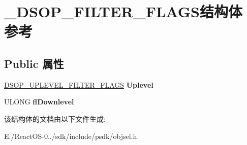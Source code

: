 \hypertarget{struct___d_s_o_p___f_i_l_t_e_r___f_l_a_g_s}{}\section{\+\_\+\+D\+S\+O\+P\+\_\+\+F\+I\+L\+T\+E\+R\+\_\+\+F\+L\+A\+G\+S结构体 参考}
\label{struct___d_s_o_p___f_i_l_t_e_r___f_l_a_g_s}
\subsection*{Public 属性}
\begin{DoxyCompactItemize}
\item 
\mbox{\label{struct___d_s_o_p___f_i_l_t_e_r___f_l_a_g_s_a6b1b0d65e434c73efa18ab8bf1bcc071}} 
\hyperlink{struct___d_s_o_p___u_p_l_e_v_e_l___f_i_l_t_e_r___f_l_a_g_s}{D\+S\+O\+P\+\_\+\+U\+P\+L\+E\+V\+E\+L\+\_\+\+F\+I\+L\+T\+E\+R\+\_\+\+F\+L\+A\+GS} {\bfseries Uplevel}
\item 
\mbox{\label{struct___d_s_o_p___f_i_l_t_e_r___f_l_a_g_s_affcd900c362d679c0025c632ceec4efd}} 
U\+L\+O\+NG {\bfseries fl\+Downlevel}
\end{DoxyCompactItemize}


该结构体的文档由以下文件生成\+:\begin{DoxyCompactItemize}
\item 
E\+:/\+React\+O\+S-\/0../sdk/include/psdk/objsel.\+h\end{DoxyCompactItemize}
